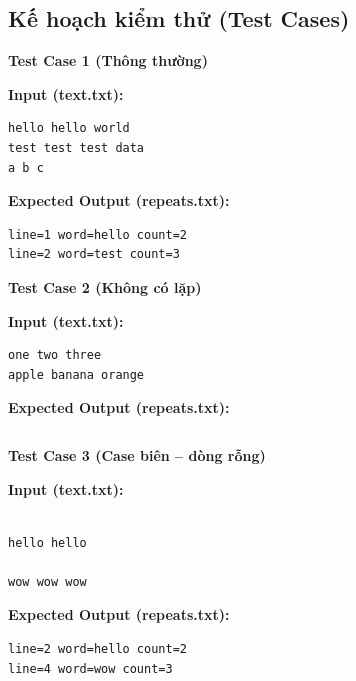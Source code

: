 \subsection{Kế hoạch kiểm thử (Test Cases)}

\textbf{Test Case 1 (Thông thường)}

\textbf{Input (text.txt):}

\begin{lstlisting}
hello hello world
test test test data
a b c
\end{lstlisting}

\textbf{Expected Output (repeats.txt):}

\begin{lstlisting}
line=1 word=hello count=2
line=2 word=test count=3
\end{lstlisting}

\vspace{0.5cm}

\textbf{Test Case 2 (Không có lặp)}

\textbf{Input (text.txt):}

\begin{lstlisting}
one two three
apple banana orange
\end{lstlisting}

\textbf{Expected Output (repeats.txt):}

\begin{lstlisting}

\end{lstlisting}

\vspace{0.5cm}

\textbf{Test Case 3 (Case biên -- dòng rỗng)}

\textbf{Input (text.txt):}

\begin{lstlisting}

hello hello

wow wow wow
\end{lstlisting}

\textbf{Expected Output (repeats.txt):}

\begin{lstlisting}
line=2 word=hello count=2
line=4 word=wow count=3
\end{lstlisting}